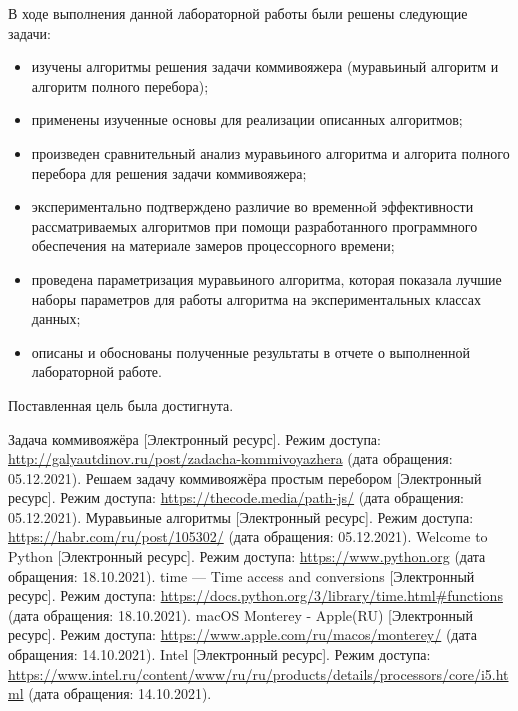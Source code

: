 \documentclass[a4paper,14pt, unknownkeysallowed]{extreport}
\begin{document}
В ходе выполнения данной лабораторной работы были решены следующие задачи:
\begin{itemize}
	\item изучены алгоритмы решения задачи коммивояжера (муравьиный алгоритм и алгоритм полного перебора);
	\item применены изученные основы для реализации описанных алгоритмов;
	\item произведен сравнительный анализ муравьиного алгоритма и алгорита полного перебора для решения задачи коммивояжера;
	\item экспериментально подтверждено различие во временнoй эффективности рассматриваемых алгоритмов при помощи разработанного программного обеспечения на материале замеров процессорного времени;
	\item проведена параметризация муравьиного алгоритма, которая показала лучшие наборы параметров для работы алгоритма на экспериментальных классах данных;
	\item описаны и обоснованы полученные результаты в отчете о выполненной лабораторной работе.
\end{itemize}

Поставленная цель была достигнута.





\begin{thebibliography}{5}
	Задача коммивояжёра [Электронный ресурс]. Режим доступа: \url{http://galyautdinov.ru/post/zadacha-kommivoyazhera} (дата обращения: 05.12.2021).
	Решаем задачу коммивояжёра простым перебором [Электронный ресурс]. Режим доступа: \url{https://thecode.media/path-js/} (дата обращения: 05.12.2021).
	Муравьиные алгоритмы [Электронный ресурс]. Режим доступа: \url{https://habr.com/ru/post/105302/} (дата обращения: 05.12.2021).
	Welcome to Python [Электронный ресурс]. Режим доступа: \url{https://www.python.org} (дата обращения: 18.10.2021).
	time — Time access and conversions [Электронный ресурс]. Режим доступа: \url{https://docs.python.org/3/library/time.html#functions} (дата обращения: 18.10.2021).
	macOS Monterey - Apple(RU) [Электронный ресурс]. Режим доступа: \url{https://www.apple.com/ru/macos/monterey/} (дата обращения: 14.10.2021).
	Intel [Электронный ресурс]. Режим доступа: \url{https://www.intel.ru/content/www/ru/ru/products/details/processors/core/i5.html} (дата обращения: 14.10.2021).
\end{thebibliography}

\end{document}
